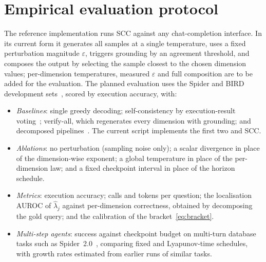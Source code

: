 \documentclass[preprint,12pt]{elsarticle}
\begin{document}
\section{Empirical evaluation protocol}
\label{sec:protocol}
The reference implementation runs SCC against any chat-completion interface. In its current form it generates all samples at a single temperature, uses a fixed perturbation magnitude $\varepsilon$, triggers grounding by an agreement threshold, and composes the output by selecting the sample closest to the chosen dimension values; per-dimension temperatures, measured $\varepsilon$ and full composition are to be added for the evaluation. The planned evaluation uses the Spider and BIRD development sets~\cite{yu2018spider,li2023bird}, scored by execution accuracy, with:
\begin{itemize}
\item \emph{Baselines}: single greedy decoding; self-consistency by execution-result voting~\cite{wang2023sc}; verify-all, which regenerates every dimension with grounding; and decomposed pipelines~\cite{pourreza2023}. The current script implements the first two and SCC.
\item \emph{Ablations}: no perturbation (sampling noise only); a scalar divergence in place of the dimension-wise exponent; a global temperature in place of the per-dimension law; and a fixed checkpoint interval in place of the horizon schedule.
\item \emph{Metrics}: execution accuracy; calls and tokens per question; the localisation AUROC of $\hat\lambda_j$ against per-dimension correctness, obtained by decomposing the gold query; and the calibration of the bracket~\eqref{eq:bracket}.
\item \emph{Multi-step agents}: success against checkpoint budget on multi-turn database tasks such as Spider~2.0~\cite{lei2025spider2}, comparing fixed and Lyapunov-time schedules, with growth rates estimated from earlier runs of similar tasks.
\end{itemize}

\end{document}
